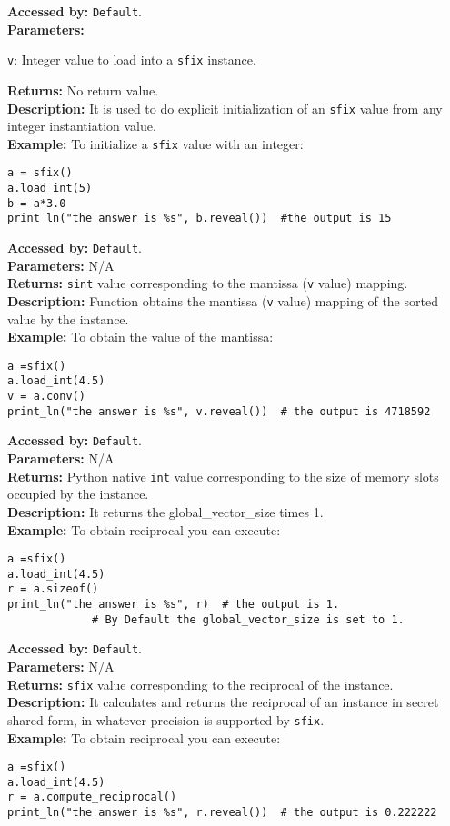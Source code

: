 \textbf{Accessed by:} \verb|Default|.		 \\
\textbf{Parameters:}
\begin{description}
  \item \verb|v|: Integer value to load into a \verb|sfix| instance.
\end{description}
\textbf{Returns:} No return value. \\
\textbf{Description:}
It is used to do explicit initialization of an \verb|sfix| value from any integer instantiation value. \\
\textbf{Example:}
To initialize a \verb|sfix| value with an integer:
\begin{lstlisting}
a = sfix()
a.load_int(5)
b = a*3.0
print_ln("the answer is %s", b.reveal())  #the output is 15
\end{lstlisting}
\textbf{Accessed by:} \verb|Default|.		 \\
\textbf{Parameters:} N/A \\
\textbf{Returns:} \verb|sint| value corresponding to the mantissa (\verb|v| value) mapping. \\
\textbf{Description:}
Function obtains the mantissa (\verb|v| value) mapping of the sorted value by the instance. \\
\textbf{Example:}
To obtain the value of the mantissa:
\begin{lstlisting}
a =sfix()
a.load_int(4.5)
v = a.conv()
print_ln("the answer is %s", v.reveal())  # the output is 4718592
\end{lstlisting}


\textbf{Accessed by:} \verb|Default|.		 \\
\textbf{Parameters:} N/A \\
\textbf{Returns:}
Python native \verb|int| value corresponding to the size of memory slots occupied by the instance. \\
\textbf{Description:}
It returns the global_vector_size times 1. \\
\textbf{Example:}
To obtain reciprocal you can execute:
\begin{lstlisting}
a =sfix()
a.load_int(4.5)
r = a.sizeof()
print_ln("the answer is %s", r)  # the output is 1.
             # By Default the global_vector_size is set to 1.
\end{lstlisting}
\textbf{Accessed by:} \verb|Default|.		 \\
\textbf{Parameters:} N/A \\
\textbf{Returns:} \verb|sfix| value corresponding to the reciprocal of the instance. \\
\textbf{Description:}
It calculates and returns the reciprocal of an instance in secret shared form,
in whatever precision is supported by \verb|sfix|.\\
\textbf{Example:}
To obtain reciprocal you can execute:
\begin{lstlisting}
a =sfix()
a.load_int(4.5)
r = a.compute_reciprocal()
print_ln("the answer is %s", r.reveal())  # the output is 0.222222
\end{lstlisting}
